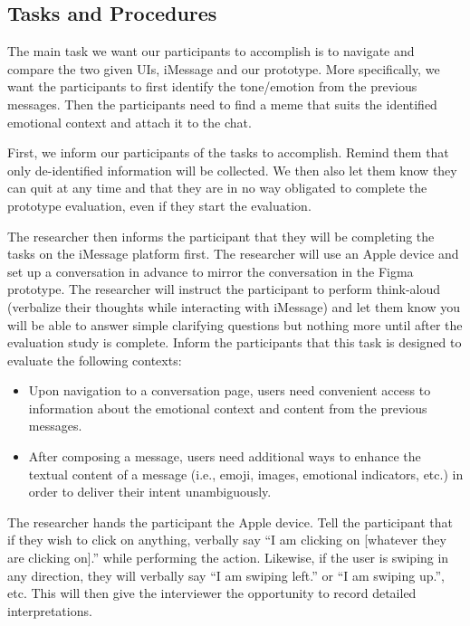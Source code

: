 \documentclass[acmsmall,screen,authorversion,nonacm]{acmart}
\begin{document}
\subsection{Tasks and Procedures}
The main task we want our participants to accomplish is to navigate and compare the two given UIs, iMessage and our prototype. More specifically, we want the participants to first identify the tone/emotion from the previous messages. Then the participants need to find a meme that suits the identified emotional context and attach it to the chat. 

First, we inform our participants of the tasks to accomplish. Remind them that only de-identified information will be collected. We then also let them know they can quit at any time and that they are in no way obligated to complete the prototype evaluation, even if they start the evaluation. 

The researcher then informs the participant that they will be completing the tasks on the iMessage platform first. The researcher will use an Apple device and set up a conversation in advance to mirror the conversation in the Figma prototype. The researcher will instruct the participant to perform think-aloud (verbalize their thoughts while interacting with iMessage) and let them know you will be able to answer simple clarifying questions but nothing more until after the evaluation study is complete. Inform the participants that this task is designed to evaluate the following contexts: 

\begin{itemize}
    \item Upon navigation to a conversation page, users need convenient access to information about the emotional context and content from the previous messages.
    \item After composing a message, users need additional ways to enhance the textual content of a message (i.e., emoji, images, emotional indicators, etc.) in order to deliver their intent unambiguously.
\end{itemize}

The researcher hands the participant the Apple device. Tell the participant that if they wish to click on anything, verbally say “I am clicking on [whatever they are clicking on].” while performing the action. Likewise, if the user is swiping in any direction, they will verbally say “I am swiping left.” or “I am swiping up.”, etc. This will then give the interviewer the opportunity to record detailed interpretations.
\end{document}
